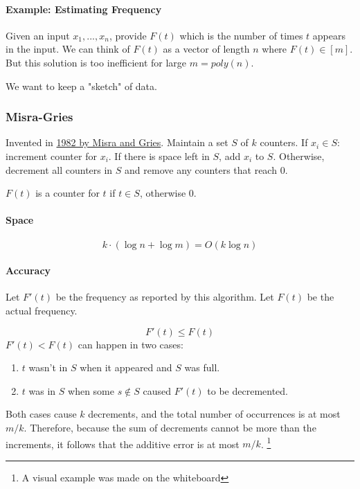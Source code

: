\documentclass[a4paper]{article}
\begin{document}
\paragraph{Example: Estimating Frequency}
Given an input $x_1,...,x_n$, provide $F(t)$ which is the number of times $t$ appears in the input.
We can think of $F(t)$ as a vector of length $n$ where $F(t) \in [m]$.
But this solution is too inefficient for large $m=poly(n)$.

We want to keep a "sketch" of data.

\subsubsection{Misra-Gries}
Invented in \href{http://www.mathcs.emory.edu/~cheung/papers/StreamDB/Frequency-count/1982-Misra-FindRepeatedElements.pdf}{1982 by Misra and Gries}.
Maintain a set $S$ of $k$ counters.
If $x_i \in S$: increment counter for $x_i$.
If there is space left in $S$, add $x_i$ to $S$.
Otherwise, decrement all counters in $S$ and remove any counters that reach 0.

$F(t)$ is a counter for $t$ if $t \in S$, otherwise 0.

\paragraph{Space}
\[k \cdot (\log n + \log m) = O(k \log n)\]

\paragraph{Accuracy}
Let $F'(t)$ be the frequency as reported by this algorithm. Let $F(t)$ be the actual frequency.

\[F'(t) \le F(t)\]
$F'(t) < F(t)$ can happen in two cases:

\begin{enumerate}
  \item $t$ wasn't in $S$ when it appeared and $S$ was full.
  \item $t$ was in $S$ when some $s \notin S$ caused $F'(t)$ to be decremented.
\end{enumerate}

Both cases cause $k$ decrements, and the total number of occurrences is at most $m/k$.
Therefore, because the sum of decrements cannot be more than the increments, it follows that the additive error is at most $m/k$.
\footnote{A visual example was made on the whiteboard}
\end{document}
